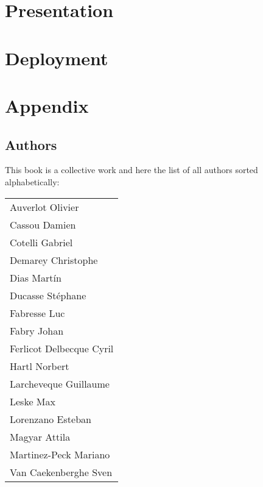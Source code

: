 \documentclass[10pt,twoside,showtrims]{support/latex/sbabook}
\begin{document}
\part{Presentation}










\part{Deployment}



\appendix

\part{Appendix}

\chapter{Authors}

This book is a collective work and here the list of all authors sorted alphabetically:

\begin{tabular}{l}
Auverlot Olivier  \\
Cassou Damien\\
Cotelli Gabriel\\
Demarey Christophe\\
Dias Martín\\
Ducasse Stéphane\\
Fabresse Luc\\
Fabry Johan\\
Ferlicot Delbecque Cyril\\
Hartl Norbert\\
Larcheveque Guillaume\\
Leske Max\\
Lorenzano Esteban\\
Magyar Attila\\
Martinez-Peck Mariano\\
Van Caekenberghe Sven\\
\end{tabular}

\backmatter
\end{document}

